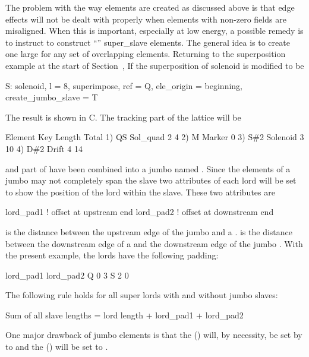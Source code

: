 The problem with the way  elements are created as
discussed above is that edge effects will not be dealt with properly
when elements with non-zero fields are misaligned. When this is
important, especially at low energy, a possible remedy is to instruct
\bmad to construct ``'' super_slave elements. The general
idea is to create one large  for any set of
overlapping elements. Returning to the superposition example at the
start of Section~, If the superposition of solenoid 
is modified to be
\begin{example}
  S: solenoid, l = 8, superimpose, ref = Q, ele_origin = beginning, 
               create_jumbo_slave = T
\end{example}
The result is shown in C. The tracking part of the lattice
will be
\begin{example}
        Element   Key         Length  Total     
  1)    Q{\B}S       Sol_quad     2        4
  2)    M         Marker       0      
  3)    S{\#}2       Solenoid     3       10
  4)    D{\#}2       Drift        4       14
\end{example}
 and part of  have been combined into a jumbo
 named . Since the  elements
of a jumbo  may not completely span the slave two
attributes of each lord will be set to show the position of the lord
within the slave. These two attributes are
\begin{example}
  lord_pad1    ! offset at upstream end
  lord_pad2    ! offset at downstream end
\end{example}
 is the distance between the upstream edge of the jumbo
 and a .  is the distance 
between the downstream edge of a  and the downstream edge
of the jumbo . With the present example, the lords have
the following padding:
\begin{example}
          lord_pad1    lord_pad2
  Q            0            3
  S            2            0
\end{example}
The following rule holds for all super lords with and without jumbo slaves:
\begin{example}
  Sum of all slave lengths = lord length + lord_pad1 + lord_pad2
\end{example}

One major drawback of jumbo  elements is that the
 () will, by necessity, be set by \bmad to
 and the  () will be set to
.

